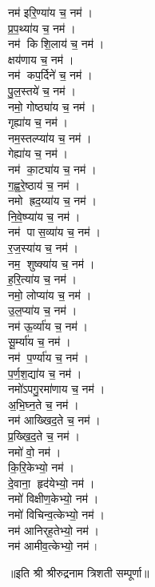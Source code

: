 \begin{multicols}{2}
\begin{flushleft}
नम॑ इरि॒ण्या॑य च॒ नम॑।\\
प्र॒प॒थ्या॑य च॒ नम॑।\\
नम॑ किशि॒लाय॑ च॒ नम॑।\\
क्षय॑णाय च॒ नम॑।\\
नम॑ कप॒र्दिने॑ च॒ नम॑।\hfill {}\\
पु॒ल॒स्तये॑ च॒ नम॑।\\
नमो॒ गोष्ठ्या॑य च॒ नम॑।\\
गृह्या॑य च॒ नम॑।\\
नम॒स्तल्प्या॑य च॒ नम॑।\\
गेह्या॑य च॒ नम॑।\\
नम॑ का॒ट्या॑य च॒ नम॑।\\
ग॒ह्व॒रे॒ष्ठाय॑ च॒ नम॑।\\
नमो ह्रद॒य्या॑य च॒ नम॑।\\
नि॒वे॒ष्प्या॑य च॒ नम॑।\\
नम॑ पास॒व्या॑य च॒ नम॑।\hfill {}\\
र॒ज॒स्या॑य च॒ नम॑।\\
नम॒ शुष्क्या॑य च॒ नम॑।\\
ह॒रि॒त्या॑य च॒ नम॑।\\
नमो॒ लोप्या॑य च॒ नम॑।\\
उ॒ल॒प्या॑य च॒ नम॑।\\
नम॑ ऊ॒र्व्या॑य च॒ नम॑।\\
सू॒र्म्या॑य च॒ नम॑।\\
नम॑ प॒र्ण्या॑य च॒ नम॑।\\
प॒र्ण॒श॒द्या॑य च॒ नम॑।\\
नमो॑ऽपगु॒रमा॑णाय च॒ नम॑।\hfill {}\\
अ॒भि॒घ्न॒ते च॒ नम॑।\\
नम॑ आख्खिद॒ते च॒ नम॑।\\
प्र॒ख्खि॒द॒ते च॒ नम॑।\\
नमो॑ वो॒ नम॑।\\
कि॒रि॒केभ्यो॒ नम॑।\\
दे॒वाना॒ हृद॑येभ्यो॒ नम॑।\\
नमो॑ विक्षीण॒केभ्यो॒ नम॑।\\
नमो॑ विचिन्व॒त्केभ्यो॒ नम॑।\\
नम॑ आनिर्‌ह॒तेभ्यो॒ नम॑।\\
नम॑ आमीव॒त्केभ्यो॒ नम॑।\hfill {}\\
\end{flushleft}
\end{multicols}
\centerline{॥इति श्री श्रीरुद्रनाम त्रिशती सम्पूर्णा॥}
